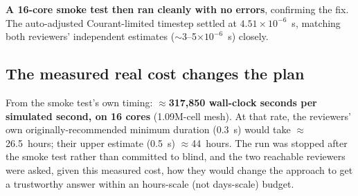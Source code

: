 \documentclass[11pt]{article}
\begin{document}
\textbf{A 16-core smoke test then ran cleanly with no errors}, confirming the fix. The auto-adjusted
Courant-limited timestep settled at $4.51\times10^{-6}$~s, matching both reviewers' independent
estimates ($\sim$3--5$\times10^{-6}$~s) closely.

\subsection*{The measured real cost changes the plan}
From the smoke test's own timing: \textbf{$\approx$317{,}850 wall-clock seconds per simulated second,
on 16 cores} (1.09M-cell mesh). At that rate, the reviewers' own originally-recommended minimum
duration (0.3~s) would take $\approx$26.5~hours; their upper estimate (0.5~s) $\approx$44~hours. The
run was stopped after the smoke test rather than committed to blind, and the two reachable reviewers
were asked, given this measured cost, how they would change the approach to get a trustworthy answer
within an hours-scale (not days-scale) budget.
\end{document}
